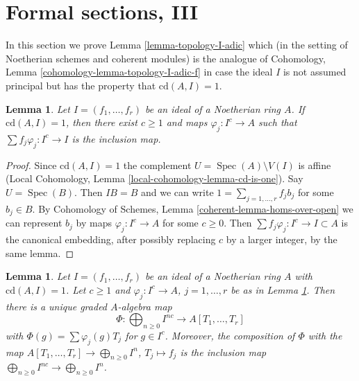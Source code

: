 \documentclass{stacks-project}
\theoremstyle{plain}
\newtheorem{lemma}[subsection]{Lemma}
\theoremstyle{definition}
\theoremstyle{remark}
\numberwithin{equation}{subsection}
\def\Spec{\mathop{\mathrm{Spec}}}
\begin{document}
\section{Formal sections, III}
\label{section-formal-sections-cd-one}

\noindent
In this section we prove Lemma \ref{lemma-topology-I-adic}
which (in the setting of Noetherian schemes and coherent modules)
is the analogue of Cohomology, Lemma \ref{cohomology-lemma-topology-I-adic-f}
in case the ideal $I$ is not assumed principal but
has the property that $\text{cd}(A, I) = 1$.

\begin{lemma}
\label{lemma-cd-one}
Let $I = (f_1, \ldots, f_r)$ be an ideal of a Noetherian ring $A$.
If $\text{cd}(A, I) = 1$, then there exist $c \geq 1$ and maps
$\varphi_j : I^c \to A$ such that $\sum f_j \varphi_j : I^c \to I$
is the inclusion map.
\end{lemma}

\begin{proof}
Since $\text{cd}(A, I) = 1$ the complement $U = \Spec(A) \setminus V(I)$
is affine (Local Cohomology, Lemma \ref{local-cohomology-lemma-cd-is-one}).
Say $U = \Spec(B)$. Then $IB = B$
and we can write $1 = \sum_{j = 1, \ldots, r} f_j b_j$
for some $b_j \in B$. By
Cohomology of Schemes, Lemma \ref{coherent-lemma-homs-over-open}
we can represent $b_j$ by maps $\varphi_j : I^c \to A$
for some $c \geq 0$. Then $\sum f_j \varphi_j : I^c \to I \subset A$
is the canonical embedding, after possibly replacing $c$ by a larger
integer, by the same lemma.
\end{proof}

\begin{lemma}
\label{lemma-cd-one-extend}
Let $I = (f_1, \ldots, f_r)$ be an ideal of a Noetherian ring $A$
with $\text{cd}(A, I) = 1$. Let $c \geq 1$ and $\varphi_j : I^c \to A$,
$j = 1, \ldots, r$ be as in Lemma \ref{lemma-cd-one}.
Then there is a unique graded $A$-algebra map
$$
\Phi : \bigoplus\nolimits_{n \geq 0} I^{nc} \to A[T_1, \ldots, T_r]
$$
with $\Phi(g) = \sum \varphi_j(g) T_j$ for $g \in I^c$.
Moreover, the composition of $\Phi$ with the map
$A[T_1, \ldots, T_r] \to \bigoplus_{n \geq 0} I^n$,
$T_j \mapsto f_j$ is the inclusion map
$\bigoplus_{n \geq 0} I^{nc} \to \bigoplus_{n \geq 0} I^n$.
\end{lemma}
\end{document}
